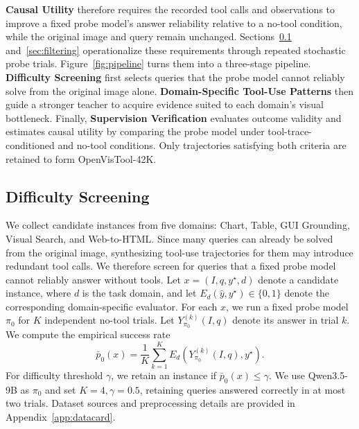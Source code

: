 \textbf{Causal Utility} therefore requires the recorded tool calls and observations to improve a fixed probe model's answer reliability relative to a no-tool condition, while the original image and query remain unchanged.
Sections~\ref{sec:data} and~\ref{sec:filtering} operationalize these requirements through repeated stochastic probe trials.
Figure~\ref{fig:pipeline} turns them into a three-stage pipeline. 
\textbf{Difficulty Screening} first selects queries that the probe model cannot reliably solve from the original image alone.
\textbf{Domain-Specific Tool-Use Patterns} then guide a stronger teacher to acquire evidence suited to each domain's visual bottleneck. 
Finally, \textbf{Supervision Verification} evaluates outcome validity and estimates causal utility by comparing the probe model under tool-trace-conditioned and no-tool conditions.
Only trajectories satisfying both criteria are retained to form OpenVisTool-42K.


\subsection{Difficulty Screening}
\label{sec:data}

We collect candidate instances from five domains: Chart, Table, GUI Grounding, Visual Search, and Web-to-HTML. 
Since many queries can already be solved from the original image, synthesizing tool-use trajectories for them may introduce redundant tool calls. 
We therefore screen for queries that a fixed probe model cannot reliably answer without tools.
Let $x=(I,q,y^\star,d)$ denote a candidate instance, where $d$ is the task domain, and let $E_d(\hat{y},y^\star)\in\{0,1\}$ denote the corresponding domain-specific evaluator.
For each $x$, we run a fixed probe model $\pi_0$ for $K$ independent no-tool trials.
Let $Y_{\pi_0}^{(k)}(I,q)$ denote its answer in trial $k$.
We compute the empirical success rate
\begin{equation}
\bar{p}_0(x)=\frac{1}{K}\sum_{k=1}^{K}E_d\left(Y_{\pi_0}^{(k)}(I,q),y^\star\right).
\label{eq:no-tool-success-rate}
\end{equation}
For difficulty threshold $\gamma$, we retain an instance if $\bar{p}_0(x)\leq\gamma$.
We use Qwen3.5-9B \citep{qwen35blog} as $\pi_0$ and set $K\!=\!4, \gamma\!=\!0.5$, retaining queries answered correctly in at most two trials. 
Dataset sources and preprocessing details are provided in Appendix~\ref{app:datacard}.


